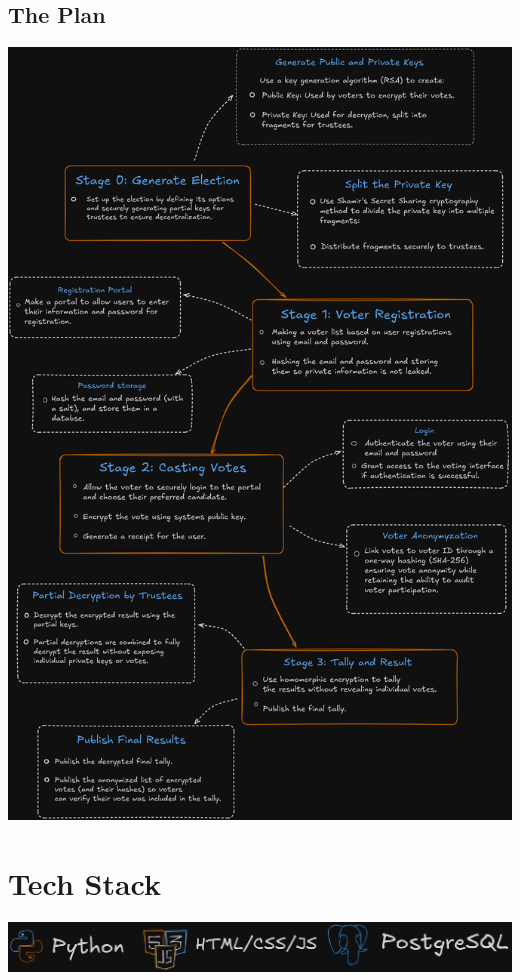 \documentclass{article}
\begin{document}
\begin{center}
    \section*{The Plan}
    \includegraphics[width=\textwidth]{plan.png}
\end{center}

\pagebreak
\section*{\centering Tech Stack}
\includegraphics[width=\textwidth]{techstack.png}
\end{document}

